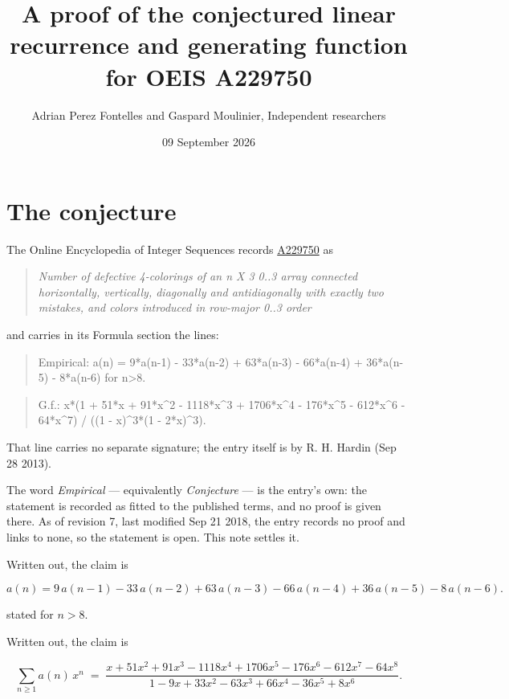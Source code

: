 \documentclass[11pt]{article}
\title{A proof of the conjectured linear recurrence and generating function for OEIS A229750}
\author{Adrian Perez Fontelles and Gaspard Moulinier, Independent researchers}
\date{09 September 2026}
\theoremstyle{definition}
\begin{document}
\maketitle
\section{The conjecture}

The Online Encyclopedia of Integer Sequences records \href{https://oeis.org/A229750}{A229750} as

\begin{quote}\itshape Number of defective 4-colorings of an n X 3 0..3 array connected horizontally, vertically, diagonally and antidiagonally with exactly two mistakes, and colors introduced in row-major 0..3 order\end{quote}

and carries in its Formula section the lines:

\begin{quote}\ttfamily Empirical: a(n) = 9*a(n-1) - 33*a(n-2) + 63*a(n-3) - 66*a(n-4) + 36*a(n-5) - 8*a(n-6) for n>8.\end{quote}

\begin{quote}\ttfamily G.f.: x*(1 + 51*x + 91*x\textasciicircum{}2 - 1118*x\textasciicircum{}3 + 1706*x\textasciicircum{}4 - 176*x\textasciicircum{}5 - 612*x\textasciicircum{}6 - 64*x\textasciicircum{}7) / ((1 - x)\textasciicircum{}3*(1 - 2*x)\textasciicircum{}3).\end{quote}

That line carries no separate signature; the entry itself is by R. H. Hardin (Sep 28 2013).

The word {\itshape Empirical} --- equivalently {\itshape Conjecture} --- is the entry's own: the statement is recorded as fitted to the published terms, and no proof is given there. As of revision 7, last modified Sep 21 2018, the entry records no proof and links to none, so the statement is open. This note settles it.

Written out, the claim is

\[a(n) = 9\,a(n-1) - 33\,a(n-2) + 63\,a(n-3) - 66\,a(n-4) + 36\,a(n-5) - 8\,a(n-6).\]

stated for $n > 8$.

Written out, the claim is

\[\sum_{n \ge 1} a(n)\,x^n \;=\; \frac{x + 51x^{2} + 91x^{3} - 1118x^{4} + 1706x^{5} - 176x^{6} - 612x^{7} - 64x^{8}}{1 - 9x + 33x^{2} - 63x^{3} + 66x^{4} - 36x^{5} + 8x^{6}}.\]
\end{document}
